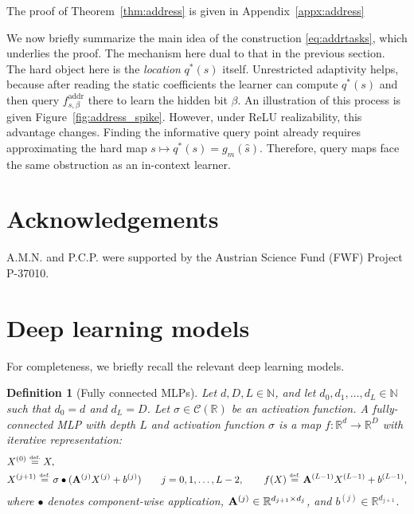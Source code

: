 \documentclass{article}
\newtheorem{definition}{Definition}[section]
\newcommand{\eqdef }{\ensuremath{\stackrel{\mbox{\upshape\tiny def.}}{=}}}
\begin{document}
The proof of Theorem~\ref{thm:address} is given in Appendix~\ref{appx:address}

We now briefly summarize the main idea of the construction \eqref{eq:addrtasks}, which underlies the proof.
The mechanism here dual to that in the previous section. 
The hard object here is the \emph{location} $q^\ast(s)$ itself. Unrestricted adaptivity helps,
because after reading the static coefficients the learner %
can compute $q^\ast(s)$ and then query $f^{\mathrm{addr}}_{s,\beta}$ there to learn the hidden bit $\beta$. 
An illustration of this process is given Figure~\ref{fig:address_spike}.
However, under ReLU realizability, this advantage changes.
Finding the informative query point
already requires approximating the hard map $s\mapsto q^\ast(s)=g_m(\widehat s)$. Therefore, query maps %
face the
same obstruction as %
an in-context learner. 



\section*{Acknowledgements}

A.M.N. and P.C.P. were %
supported by the Austrian Science Fund (FWF) Project P-37010.

\newpage





\appendix

\section{Deep learning models}
\label{s:models}

For completeness, we briefly recall the relevant deep learning models.
 

\begin{definition}[Fully connected MLPs]
Let $d,D,L\in\mathbb{N}$, and let $d_0,d_1,\dots,d_L\in\mathbb{N}$ such that $d_0=d$ and $d_L=D$.
Let $\sigma\in \mathcal{C}(\mathbb{R})$ be an activation function.
A fully-connected MLP with depth $L$ and activation function $\sigma$ is a map $f:\mathbb{R}^d\to\mathbb{R}^D$ with iterative representation:
\begin{align*} %
    &X^{(0)} 
    \eqdef  X, \\
    &X^{(j+1)} 
    \eqdef  
    \sigma\bullet({\bf A}^{(j)} X^{(j)} + b^{(j)}) \qquad j=0,1,\dots,L-2,
    \qquad f(X)
    \eqdef  
    {\bf A}^{(L-1)} X^{(L-1)} + b^{(L-1)},
\end{align*}
where $\bullet$ denotes component-wise application, ${\bf A}^{(j)}\in\mathbb{R}^{d_{j+1}\times d_j}$, and $b^{(j)}\in\mathbb{R}^{d_{j+1}}$.
\end{definition}
\end{document}
